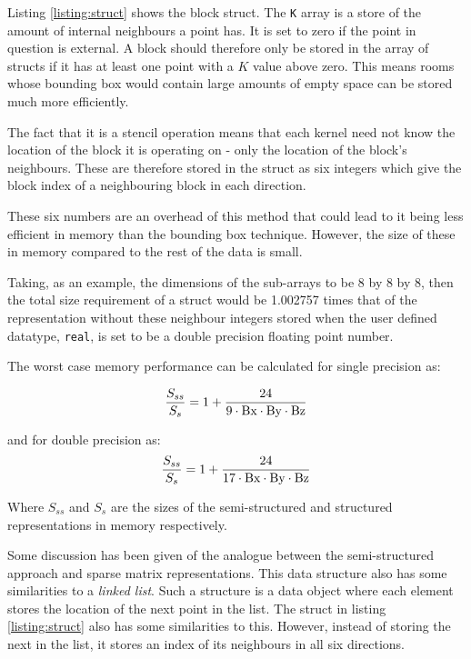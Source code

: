 \documentclass[12pt,a4paper]{report}
\begin{document}
Listing \ref{listing:struct} shows the block struct. The \lstinline|K| array is a store of the amount of internal neighbours a point has. It is set to zero if the point in question is external. A block should therefore only be stored in the array of structs if it has at least one point with a $K$ value above zero. This means rooms whose bounding box would contain large amounts of empty space can be stored much more efficiently.

The fact that it is a stencil operation means that each kernel need not know the location of the block it is operating on - only the location of the block's neighbours. These are therefore stored in the struct as six integers which give the block index of a neighbouring block in each direction.

These six numbers are an overhead of this method that could lead to it being less efficient in memory than the bounding box technique. However, the size of these in memory compared to the rest of the data is small.


Taking, as an example, the dimensions of the sub-arrays to be 8 by 8 by 8, then the total size requirement of a struct would be \num{1.002757} times that of the representation without these neighbour integers stored when the user defined datatype, \verb|real|, is set to be a double precision floating point number.

The worst case memory performance can be calculated for single precision as: 

\begin{equation}
\frac{S_{ss}}{S_{s}} = 1 + \frac{24}{9\cdot\lstinline|Bx|\cdot\lstinline|By|\cdot\lstinline|Bz|}
\label{equation:single-neghbours}
\end{equation}

and for double precision as:
\begin{equation}
\frac{S_{ss}}{S_{s}} = 1 + \frac{24}{17\cdot\lstinline|Bx|\cdot\lstinline|By|\cdot\lstinline|Bz|}
\label{equation:double-neghbours}
\end{equation}

Where $S_{ss}$ and $S_{s}$ are the sizes of the semi-structured and structured representations in memory respectively.


Some discussion has been given of the analogue between the semi-structured approach and sparse matrix representations. This data structure also has some similarities to a \textit{linked list}. Such a structure is a data object where each element stores the location of the next point in the list. The struct in listing \ref{listing:struct} also has some similarities to this. However, instead of storing the next in the list, it stores an index of its neighbours in all six directions.
\end{document}
